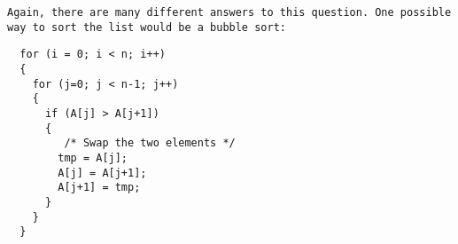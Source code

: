 \documentclass[11pt]{article}
\begin{document}
{\tt Again, there are many different answers to this question.  One possible
way to sort the list would be a bubble sort:

\begin{verbatim}
  for (i = 0; i < n; i++)
  {
    for (j=0; j < n-1; j++)
    {
      if (A[j] > A[j+1])
      {
         /* Swap the two elements */
        tmp = A[j];
        A[j] = A[j+1];
        A[j+1] = tmp;
      }
    }
  }
\end{verbatim}

}

 
\end{document}
